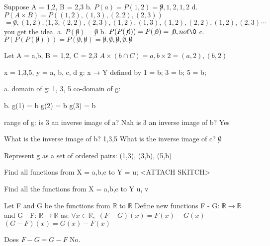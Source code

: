\documentclass[12pt]{article}
\begin{document}
Suppose A = {1,2}, B = {2,3}
b. $P(a) = P({1,2}) = {\not 9, {1}, {2}, {1,2}}$
d. $P(A \times B) = P({(1,2), (1,3), (2,2), (2,3)})$
$= \not 0, {(1,2)}, {(1,3}, {(2,2)}, {(2,3)}, {(1,2), (1,3)}, {(1,2), (2,2)}, {(1,2), (2,3)} \cdots$ you get the idea.
a. $P(\not 0) = {\not 0}$
b. $P(P(\not 0)) = P({\not 0}) = {\not 0, {not \0}}$
c. $P(P(P(\not 0))) = P({\not 0, {\not 0}}) = {\not 0, {\not 0}, {{\not 0}}, {\not 0, {\not 0}}}$

Let A = {a,b}, B = {1,2}, C = {2,3}
$A \times (b \cap C) = {a,b} \times {2} = {(a,2), (b,2)}$

x = {1,3,5}, y = {a, b, c, d}
g: x → Y defined by 1 = b; 3 = b; 5 = b;

a. domain of g: {1, 3, 5}
   co-domain of g:

b. g(1) = b
   g(2) = b
   g(3) = b

range of g:
is 3 an inverse image of a? Nah
is 3 an inverse image of b? Yes

What is the inverse image of b? {1,3,5}
What is the inverse image of c? $\not 0$

Represent g as a set of ordered pairs: {(1,3), (3,b), (5,b)}


Find all functions from X = {a,b,c} to Y = {u};
<ATTACH SKITCH>

Find all the functions from X = {a,b,c} to Y {u, v}

Let F and G be the functions from $\mathbb{R}$ to $\mathbb{R}$
Define new functions F - G: $\mathbb{R} \rightarrow \mathbb{R}$ and G - F: $\mathbb{R} \rightarrow \mathbb{R}$ as:
$\forall x \in \mathbb{R}, $
$(F - G)(x) = F(x) - G(x)$
$(G - F)(x) = G(x) - F(x)$


Does $F - G = G - F$
No.
\end{document}
